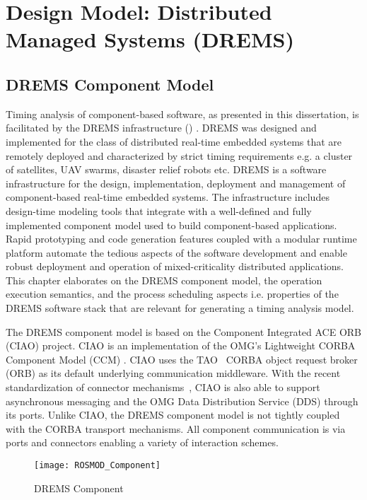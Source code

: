 \chapter{Design Model: Distributed Managed Systems (DREMS)}
\label{chapter:DREMS}

\section{DREMS Component Model}

Timing analysis of component-based software, as presented in this dissertation, is facilitated by the DREMS infrastructure (\iapfull) \cite{DREMS13Software} \cite{ISIS_F6_ISORC:13}. DREMS was designed and implemented for the class of distributed real-time embedded systems that are remotely deployed and characterized by strict timing requirements e.g. a cluster of satellites, UAV swarms, disaster relief robots etc. DREMS is a software infrastructure for the design, implementation, deployment and management of component-based real-time embedded systems. The infrastructure includes design-time modeling tools \cite{ISIS_F6_SFFMT:13} that integrate with a well-defined and fully implemented component model \cite{ISIS_F6_ISORC:13, kumar2014colored} used to build component-based applications. Rapid prototyping and code generation features coupled with a modular runtime platform automate the tedious aspects of the software development and enable robust deployment and operation of mixed-criticality distributed applications. This chapter elaborates on the DREMS component model, the operation execution semantics, and the process scheduling aspects i.e. properties of the DREMS software stack that are relevant for generating a timing analysis model.

The DREMS component model is based on the Component Integrated ACE ORB (CIAO) \cite{RT_CIAO:04, CIAO_Chap:04} project. CIAO is an implementation of the OMG's Lightweight CORBA Component Model (CCM) \cite{CCM-light:03}. CIAO uses the TAO~\cite{TAO:02} CORBA object request broker (ORB) as its default underlying communication middleware.  With the recent standardization of connector mechanisms~\cite{dds4ccm:09}, CIAO is also able to support asynchronous messaging and the OMG Data Distribution Service (DDS) through its ports. Unlike CIAO, the DREMS component model is not tightly coupled with the CORBA transport mechanisms. All component communication is via ports and connectors \cite{Connectors} enabling a variety of interaction schemes. 

\begin{figure}[h]
	\centering
	\texttt{[image: ROSMOD\_Component]}
	\caption{DREMS Component}
	\label{fig:DREMS_Component}
\end{figure}


